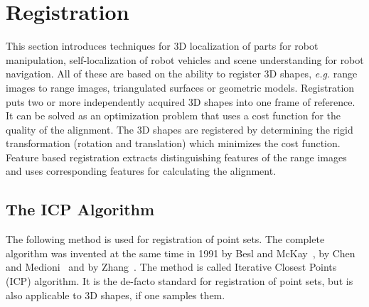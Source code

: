 \documentclass[twocolumn,oneside]{book}
\begin{document}
\section{Registration \label{ch31.2}}

This section introduces techniques for 3D localization of parts for
robot manipulation, self-localization of robot vehicles and scene
understanding for robot navigation.  All of these are based on the
ability to register 3D shapes, {\it e.g.}  range images to range
images, triangulated surfaces or geometric models.  Registration puts
two or more independently acquired 3D shapes into one frame of
reference. It can be solved as an optimization problem that uses a
cost function for the quality of the alignment. The 3D shapes are
registered by determining the rigid transformation (rotation and
translation) which minimizes the cost function. Feature based
registration extracts distinguishing features of the range images and
uses corresponding features for calculating the alignment.

\subsection{The ICP Algorithm}\label{sec:icp6D}

The following method is used for registration of point sets. The
complete algorithm was invented at the same time in 1991 by Besl and
McKay~\cite{besl2}, by Chen and Medioni~\cite{chen2} and by
Zhang~\cite{zhang2}. The method is called Iterative Closest Points
(ICP) algorithm. It is the de-facto standard for registration of point
sets, but is also applicable to 3D shapes, if one samples them.
\end{document}
